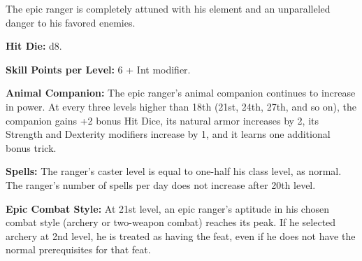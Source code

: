 
The epic ranger is completely attuned with his element and an unparalleled danger to his favored enemies.

\textbf{Hit Die:} d8.

\textbf{Skill Points per Level:} 6 + Int modifier.

\textbf{Animal Companion:} The epic ranger's animal companion continues to increase in power. At every three levels higher than 18th (21st, 24th, 27th, and so on), the companion gains +2 bonus Hit Dice, its natural armor increases by 2, its Strength and Dexterity modifiers increase by 1, and it learns one additional bonus trick.

\textbf{Spells:} The ranger's caster level is equal to one-half his class level, as normal. The ranger's number of spells per day does not increase after 20th level.

\textbf{Epic Combat Style:} At 21st level, an epic ranger's aptitude in his chosen combat style (archery or two-weapon combat) reaches its peak. If he selected archery at 2nd level, he is treated as having the  feat, even if he does not have the normal prerequisites for that feat.

